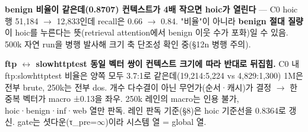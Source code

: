 \par\noindent \textbullet\enspace \textbf{benign 비율이 같은데(0.8707) 컨텍스트가 4배 작으면 hoic가 열린다} — C0 hoic 행 51,184  \ensuremath{\rightarrow}  12,833인데 recall은 0.66  \ensuremath{\rightarrow}  0.84. "비율"이 아니라 \textbf{benign 절대 질량}이 hoic를 누른다는 뜻(retrieval attention에서 benign 이웃 수가 포화)일 수 있음. 500k 자연 run을 병행 발사해 크기 축 단조성 확인 중(§12n 병행 주의).


\par\noindent \textbullet\enspace \textbf{ftp \ensuremath{\leftrightarrow} slowhttptest 동일 벡터 쌍이 컨텍스트 크기에 따라 반대로 뒤집힘.} C0 내 ftp:slowhttptest 비율은 양쪽 모두 3.7:1로 같은데(19,214:5,224 vs 4,829:1,300) 1M은 전부 brute, 250k는 전부 dos. 개수 다수결이 아닌 무언가(순서·캐시)가 결정  \ensuremath{\rightarrow}  한 중복 벡터가 macro ±0.13을 좌우. 250k 레인의 macro는 인용 불가, hoic·benign·inf·web 열만 판독. 레인 판독 기준(§8)은 hoic 기준선을 0.8364로 갱신. gate는 셧다운(τ\_\allowbreak{}pre=\allowbreak{}\ensuremath{\infty})이라 시스템 열 =\allowbreak{} global 열.


